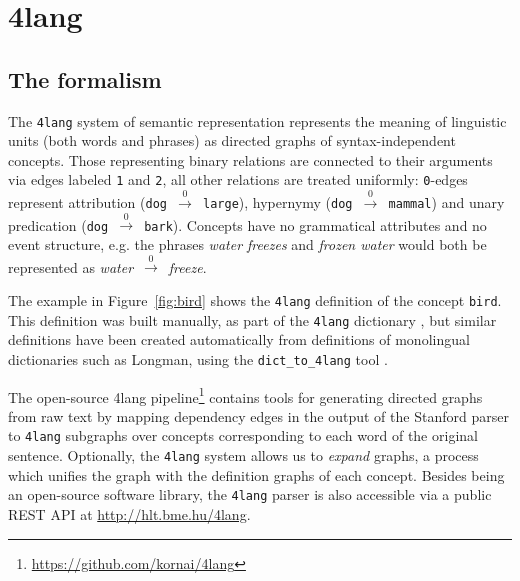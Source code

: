 \chapter*{4lang}
\label{sec:4lang}
\section{The formalism}
The \texttt{4lang} system of semantic representation \cite{Kornai:2015a}
represents the meaning of linguistic units (both words and phrases)
as directed graphs of syntax-independent concepts.
Those representing binary relations are connected to their arguments
via edges labeled \texttt{1} and \texttt{2}, all other relations are treated
uniformly: \texttt{0}-edges represent attribution (\texttt{dog
	$\xrightarrow0$ large}), hypernymy (\texttt{dog $\xrightarrow0$ mammal}) and unary predication
(\texttt{dog  $\xrightarrow0$ bark}).
Concepts have no grammatical attributes and no event structure, e.g.
the phrases \textit{water freezes} and \textit{frozen water} would both be
represented as \textit{water}~$\xrightarrow0$~\textit{freeze}. 

The example in
Figure~\ref{fig:bird} shows the \texttt{4lang} definition of the
concept \texttt{bird}. This definition was built manually, as part of
the \texttt{4lang} dictionary \cite{Kornai:2013}, but similar
definitions have been created automatically from definitions of
monolingual dictionaries such as Longman, using the
\texttt{dict\_to\_4lang} tool \cite{Recski:2016d}.

The open-source 4lang pipeline\footnote{\url{https://github.com/kornai/4lang}}
contains tools for generating
directed graphs from raw text by mapping dependency edges in the output of the
Stanford parser \cite{deMarneffe:2006} to \texttt{4lang} subgraphs over
concepts corresponding to each word of the original sentence.
Optionally, the \texttt{4lang} system allows us to \textit{expand}
graphs, a process which unifies the graph with the definition graphs of
each concept. 
Besides being an open-source software library,
the \texttt{4lang} parser is also accessible via a public
REST API at \url{http://hlt.bme.hu/4lang}.

